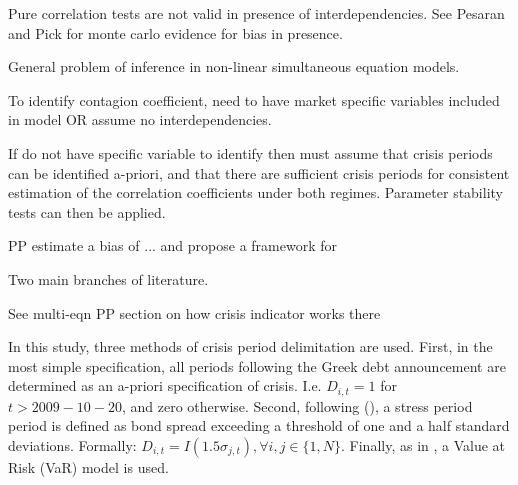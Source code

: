 \documentclass[../base.tex]{subfiles}
\begin{document}
Pure correlation tests are not valid in presence of interdependencies. See Pesaran and Pick for monte carlo evidence for bias in presence. 

General problem of inference in non-linear simultaneous equation models. 

To identify contagion coefficient, need to have market specific variables included in model OR assume no interdependencies.

If do not have specific variable to identify then must assume that crisis periods can be identified a-priori, and that there are sufficient crisis periods for consistent estimation of the correlation coefficients under both regimes. Parameter stability tests can then be applied. 

PP estimate a bias of ... and propose a framework for 

Two main branches of literature. 


See multi-eqn PP section on how crisis indicator works there

In this study, three methods of crisis period delimitation are used. First, in the most simple specification, all periods following the Greek debt announcement are determined as an a-priori specification of crisis. I.e. $D_{i,t} = 1$ for $t > 2009-10-20$, and zero otherwise. Second, following (), a stress period period is defined as bond spread exceeding a threshold of one and a half standard deviations. Formally: $D_{i,t} = I(1.5\sigma_{j,t}), \forall i, j \in \{1, N\}$. Finally, as in \cite{metiu2012sovereign}, a Value at Risk (VaR) model is used. 
\end{document}
